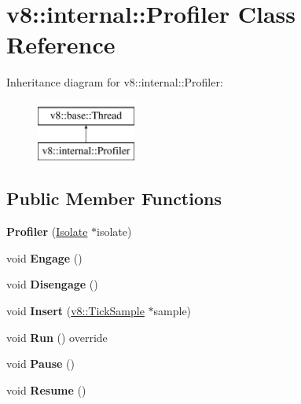 \hypertarget{classv8_1_1internal_1_1Profiler}{}\section{v8\+:\+:internal\+:\+:Profiler Class Reference}
\label{classv8_1_1internal_1_1Profiler}
Inheritance diagram for v8\+:\+:internal\+:\+:Profiler\+:\begin{figure}[H]
\begin{center}
\leavevmode
\includegraphics[height=2.000000cm]{classv8_1_1internal_1_1Profiler}
\end{center}
\end{figure}
\subsection*{Public Member Functions}
\begin{DoxyCompactItemize}
\item 
\mbox{\label{classv8_1_1internal_1_1Profiler_a183ac1da05bdb6f14004fe2b72d330f8}} 
{\bfseries Profiler} (\mbox{\hyperlink{classv8_1_1internal_1_1Isolate}{Isolate}} $\ast$isolate)
\item 
\mbox{\label{classv8_1_1internal_1_1Profiler_a5fde7f32f57422fb4a946e3c6c23a0b8}} 
void {\bfseries Engage} ()
\item 
\mbox{\label{classv8_1_1internal_1_1Profiler_aa4bf57a012df19cf1a5760086726930e}} 
void {\bfseries Disengage} ()
\item 
\mbox{\label{classv8_1_1internal_1_1Profiler_a6248ce101c44c4ef5e75b548d70e06da}} 
void {\bfseries Insert} (\mbox{\hyperlink{structv8_1_1TickSample}{v8\+::\+Tick\+Sample}} $\ast$sample)
\item 
\mbox{\label{classv8_1_1internal_1_1Profiler_a32727186a5c8e70c4dbd677cb6184f7e}} 
void {\bfseries Run} () override
\item 
\mbox{\label{classv8_1_1internal_1_1Profiler_a1487c6f52dbfb265daab4582da1c2b20}} 
void {\bfseries Pause} ()
\item 
\mbox{\label{classv8_1_1internal_1_1Profiler_a4e155191f8fd9e6dad2dc39048c9e64f}} 
void {\bfseries Resume} ()
\end{DoxyCompactItemize}

